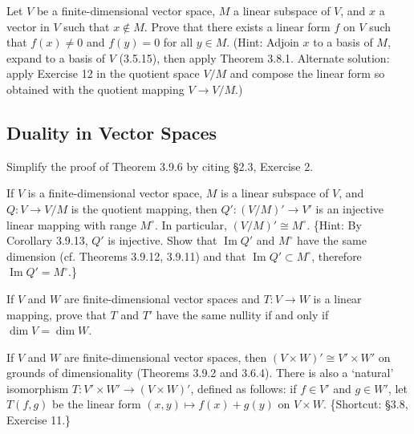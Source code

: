 \begin{tcolorbox}[title=Exercise 13, breakable]
    Let $V$ be a finite-dimensional vector space, $M$ a linear subspace of $V$, 
    and $x$ a vector in $V$ such that $x \notin M$. Prove that there exists a linear 
    form $f$ on $V$ such that $f(x) \ne 0$ and $f(y) = 0$ for all $y \in M$. 
    (Hint: Adjoin $x$ to a basis of $M$, expand to a basis of $V$ (3.5.15), then apply 
    Theorem 3.8.1. Alternate solution: apply Exercise 12 in the quotient 
    space $V/M$ and compose the linear form so obtained with the quotient 
    mapping $V \to V/M$.)
\end{tcolorbox}

\subsection{Duality in Vector Spaces}

\begin{tcolorbox}[title=Exercise 1, breakable]
    Simplify the proof of Theorem 3.9.6 by citing \S 2.3, Exercise 2.
\end{tcolorbox}

\begin{tcolorbox}[title=Exercise 2, breakable]
    If $V$ is a finite-dimensional vector space, $M$ is a linear subspace of $V$, 
    and $Q : V \to V/M$ is the quotient mapping, then $Q' : (V/M)' \to V'$ is an 
    injective linear mapping with range $M^\circ$. In particular, $(V/M)' \cong M^\circ$.
    \{Hint: By Corollary 3.9.13, $Q'$ is injective. Show that $\operatorname{Im} Q'$ and $M^\circ$ 
    have the same dimension (cf. Theorems 3.9.12, 3.9.11) and that 
    $\operatorname{Im} Q' \subset M^\circ$, therefore $\operatorname{Im} Q' = M^\circ$.\}
\end{tcolorbox}

\begin{tcolorbox}[title=Exercise 3, breakable]
    If $V$ and $W$ are finite-dimensional vector spaces and $T : V \to W$ is a 
    linear mapping, prove that $T$ and $T'$ have the same nullity if and only if 
    $\dim V = \dim W$.
\end{tcolorbox}

\begin{tcolorbox}[title=Exercise 4, breakable]
    If $V$ and $W$ are finite-dimensional vector spaces, then 
    $(V \times W)' \cong V' \times W'$ on grounds of dimensionality (Theorems 3.9.2 and 
    3.6.4). There is also a `natural' isomorphism $T : V' \times W' \to (V \times W)'$, 
    defined as follows: if $f \in V'$ and $g \in W'$, let $T(f, g)$ be the linear form 
    $(x, y) \mapsto f(x) + g(y)$ on $V \times W$. \{Shortcut: \S 3.8, Exercise 11.\}
\end{tcolorbox}

